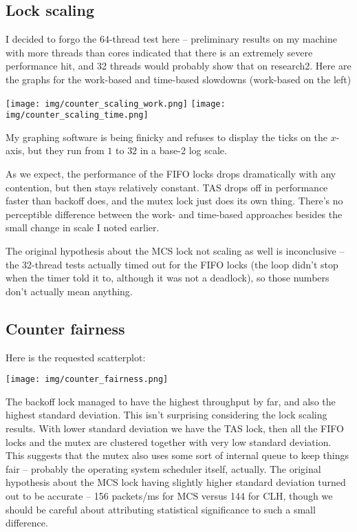 \documentclass{article}
\begin{document}
\subsection*{Lock scaling}
I decided to forgo the 64-thread test here -- preliminary results on my machine with more threads than cores indicated that there is an extremely severe performance hit, and 32 threads would probably show that on research2. Here are the graphs for the work-based and time-based slowdowns (work-based on the left)

\texttt{[image: img/counter\_scaling\_work.png]}
\texttt{[image: img/counter\_scaling\_time.png]}

My graphing software is being finicky and refuses to display the ticks on the $x$-axis, but they run from $1$ to $32$ in a base-2 log scale. 

As we expect, the performance of the FIFO locks drops dramatically with any contention, but then stays relatively constant. TAS drops off in performance faster than backoff does, and the mutex lock just does its own thing. There's no perceptible difference between the work- and time-based approaches besides the small change in scale I noted earlier.

The original hypothesis about the MCS lock not scaling as well is inconclusive -- the 32-thread tests actually timed out for the FIFO locks (the loop didn't stop when the timer told it to, although it was not a deadlock), so those numbers don't actually mean anything.
\subsection*{Counter fairness}
Here is the requested scatterplot:

\texttt{[image: img/counter\_fairness.png]}

The backoff lock managed to have the highest throughput by far, and also the highest standard deviation. This isn't surprising considering the lock scaling results. With lower standard deviation we have the TAS lock, then all the FIFO locks and the mutex are clustered together with very low standard deviation. This suggests that the mutex also uses some sort of internal queue to keep things fair -- probably the operating system scheduler itself, actually. The original hypothesis about the MCS lock having slightly higher standard deviation turned out to be accurate -- 156 packets/ms for MCS versus 144 for CLH, though we should be careful about attributing statistical significance to such a small difference.
\end{document}
